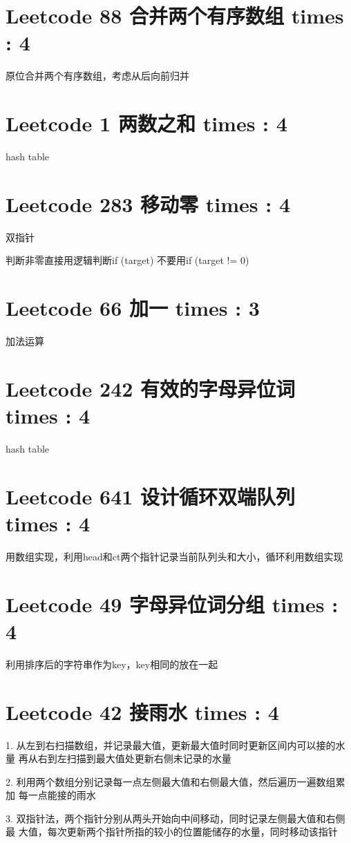 \documentclass[UTF8]{ctexart}
\begin{document}
\section{Leetcode 88 合并两个有序数组 times : 4}
原位合并两个有序数组，考虑从后向前归并

\section{Leetcode 1 两数之和 times : 4}
hash table

\section{Leetcode 283 移动零 times : 4}
双指针

判断非零直接用逻辑判断if (target) 不要用if (target != 0)

\section{Leetcode 66 加一 times : 3}
加法运算

\section{Leetcode 242 有效的字母异位词 times : 4}
hash table

\section{Leetcode 641 设计循环双端队列 times : 4}
用数组实现，利用head和ct两个指针记录当前队列头和大小，循环利用数组实现

\section{Leetcode 49 字母异位词分组 times : 4}
利用排序后的字符串作为key，key相同的放在一起

\section{Leetcode 42 接雨水 times : 4}
1. 从左到右扫描数组，并记录最大值，更新最大值时同时更新区间内可以接的水量
再从右到左扫描到最大值处更新右侧未记录的水量

2. 利用两个数组分别记录每一点左侧最大值和右侧最大值，然后遍历一遍数组累加
每一点能接的雨水

3. 双指针法，两个指针分别从两头开始向中间移动，同时记录左侧最大值和右侧最
大值，每次更新两个指针所指的较小的位置能储存的水量，同时移动该指针
\end{document}
